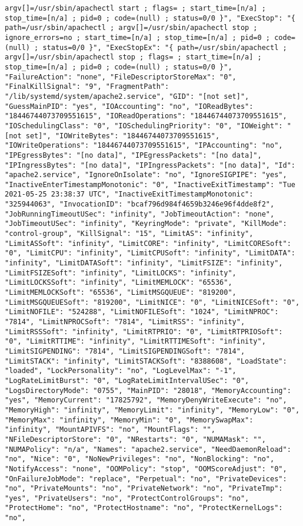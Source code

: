 \documentclass{scrartcl}
\begin{document}
\begin{Verbatim}
argv[]=/usr/sbin/apachectl start ; flags= ; start_time=[n/a] ; stop_time=[n/a] ; pid=0 ; code=(null) ; status=0/0 }", "ExecStop": "{ path=/usr/sbin/apachectl ; argv[]=/usr/sbin/apachectl stop ; ignore_errors=no ; start_time=[n/a] ; stop_time=[n/a] ; pid=0 ; code=(null) ; status=0/0 }", "ExecStopEx": "{ path=/usr/sbin/apachectl ; argv[]=/usr/sbin/apachectl stop ; flags= ; start_time=[n/a] ; stop_time=[n/a] ; pid=0 ; code=(null) ; status=0/0 }", "FailureAction": "none", "FileDescriptorStoreMax": "0", "FinalKillSignal": "9", "FragmentPath": "/lib/systemd/system/apache2.service", "GID": "[not set]", "GuessMainPID": "yes", "IOAccounting": "no", "IOReadBytes": "18446744073709551615", "IOReadOperations": "18446744073709551615", "IOSchedulingClass": "0", "IOSchedulingPriority": "0", "IOWeight": "[not set]", "IOWriteBytes": "18446744073709551615", "IOWriteOperations": "18446744073709551615", "IPAccounting": "no", "IPEgressBytes": "[no data]", "IPEgressPackets": "[no data]", "IPIngressBytes": "[no data]", "IPIngressPackets": "[no data]", "Id": "apache2.service", "IgnoreOnIsolate": "no", "IgnoreSIGPIPE": "yes", "InactiveEnterTimestampMonotonic": "0", "InactiveExitTimestamp": "Tue 2021-05-25 23:38:37 UTC", "InactiveExitTimestampMonotonic": "325944063", "InvocationID": "bcaf796d984f4659b3246e96f4dde8f2", "JobRunningTimeoutUSec": "infinity", "JobTimeoutAction": "none", "JobTimeoutUSec": "infinity", "KeyringMode": "private", "KillMode": "control-group", "KillSignal": "15", "LimitAS": "infinity", "LimitASSoft": "infinity", "LimitCORE": "infinity", "LimitCORESoft": "0", "LimitCPU": "infinity", "LimitCPUSoft": "infinity", "LimitDATA": "infinity", "LimitDATASoft": "infinity", "LimitFSIZE": "infinity", "LimitFSIZESoft": "infinity", "LimitLOCKS": "infinity", "LimitLOCKSSoft": "infinity", "LimitMEMLOCK": "65536", "LimitMEMLOCKSoft": "65536", "LimitMSGQUEUE": "819200", "LimitMSGQUEUESoft": "819200", "LimitNICE": "0", "LimitNICESoft": "0", "LimitNOFILE": "524288", "LimitNOFILESoft": "1024", "LimitNPROC": "7814", "LimitNPROCSoft": "7814", "LimitRSS": "infinity", "LimitRSSSoft": "infinity", "LimitRTPRIO": "0", "LimitRTPRIOSoft": "0", "LimitRTTIME": "infinity", "LimitRTTIMESoft": "infinity", "LimitSIGPENDING": "7814", "LimitSIGPENDINGSoft": "7814", "LimitSTACK": "infinity", "LimitSTACKSoft": "8388608", "LoadState": "loaded", "LockPersonality": "no", "LogLevelMax": "-1", "LogRateLimitBurst": "0", "LogRateLimitIntervalUSec": "0", "LogsDirectoryMode": "0755", "MainPID": "28018", "MemoryAccounting": "yes", "MemoryCurrent": "17825792", "MemoryDenyWriteExecute": "no", "MemoryHigh": "infinity", "MemoryLimit": "infinity", "MemoryLow": "0", "MemoryMax": "infinity", "MemoryMin": "0", "MemorySwapMax": "infinity", "MountAPIVFS": "no", "MountFlags": "", "NFileDescriptorStore": "0", "NRestarts": "0", "NUMAMask": "", "NUMAPolicy": "n/a", "Names": "apache2.service", "NeedDaemonReload": "no", "Nice": "0", "NoNewPrivileges": "no", "NonBlocking": "no", "NotifyAccess": "none", "OOMPolicy": "stop", "OOMScoreAdjust": "0", "OnFailureJobMode": "replace", "Perpetual": "no", "PrivateDevices": "no", "PrivateMounts": "no", "PrivateNetwork": "no", "PrivateTmp": "yes", "PrivateUsers": "no", "ProtectControlGroups": "no", "ProtectHome": "no", "ProtectHostname": "no", "ProtectKernelLogs": "no", 
\end{Verbatim}
\end{document}

